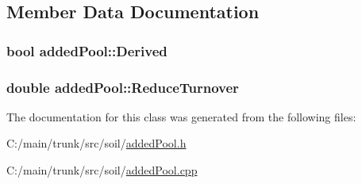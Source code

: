 \subsection{Member Data Documentation}
\hypertarget{classadded_pool_ad9e02a173998be72b421c76b2807e33c}{
\subsubsection[{Derived}]{\setlength{\rightskip}{0pt plus 5cm}bool {\bf addedPool::Derived}}}
\label{classadded_pool_ad9e02a173998be72b421c76b2807e33c}
\hypertarget{classadded_pool_a50a8a0c125b2e0ba0c0e3b07128c9d6c}{
\subsubsection[{ReduceTurnover}]{\setlength{\rightskip}{0pt plus 5cm}double {\bf addedPool::ReduceTurnover}}}
\label{classadded_pool_a50a8a0c125b2e0ba0c0e3b07128c9d6c}


The documentation for this class was generated from the following files:\begin{DoxyCompactItemize}
\item 
C:/main/trunk/src/soil/\hyperlink{added_pool_8h}{addedPool.h}\item 
C:/main/trunk/src/soil/\hyperlink{added_pool_8cpp}{addedPool.cpp}\end{DoxyCompactItemize}
